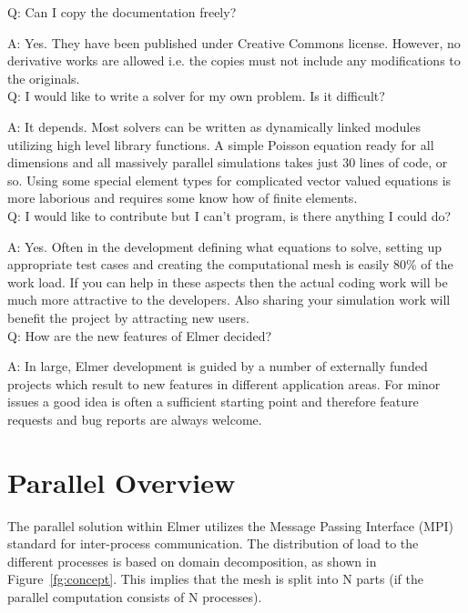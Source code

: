    Q: Can I copy the documentation freely?

    A: Yes. They have been published under Creative Commons license. However, no derivative works are allowed i.e. the copies must not include any modifications to the originals.\\

    Q: I would like to write a solver for my own problem. Is it difficult?

    A: It depends. Most solvers can be written as dynamically linked modules utilizing high level library functions. A simple Poisson equation ready for all dimensions and all massively parallel simulations takes just 30 lines of code, or so. Using some special element types for complicated vector valued equations is more laborious and requires some know how of finite elements.\\

    Q: I would like to contribute but I can't program, is there anything I could do?

    A: Yes. Often in the development defining what equations to solve, setting up appropriate test cases and creating the computational mesh is easily 80\% of the work load. If you can help in these aspects then the actual coding work will be much more attractive to the developers. Also sharing your simulation work will benefit the project by attracting new users.\\

    Q: How are the new features of Elmer decided?

    A: In large, Elmer development is guided by a number of externally funded projects which result to new features in different application areas. For minor issues a good idea is often a sufficient starting point and therefore feature requests and bug reports are always welcome.

\section{Parallel Overview}

The parallel solution within Elmer utilizes the Message Passing Interface (MPI) standard for inter-process communication. The distribution of load to the different processes is based on domain decomposition, as shown in Figure~\ref{fg:concept}. This implies that the mesh is split into N parts (if the parallel computation consists of N processes). 

